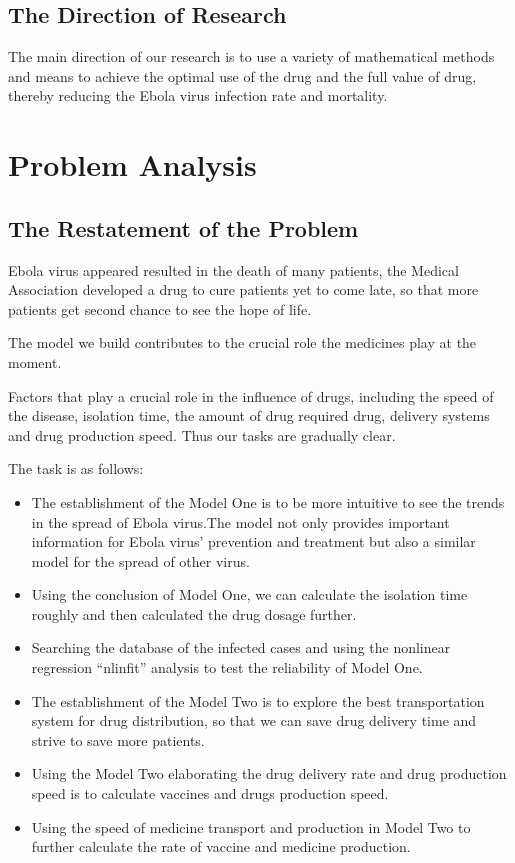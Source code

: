 \documentclass{icmmcm}
\begin{document}
\subsection{The Direction of Research}
The main direction of our research is to use a variety of
mathematical methods and means to achieve the optimal use 
of the drug and the full value of drug, thereby reducing the
Ebola virus infection rate and mortality.
\section{Problem Analysis}
\subsection{The Restatement of the Problem}
Ebola virus appeared resulted in the death of many patients,
the Medical Association developed a drug to cure patients yet
to come late, so that more patients get second chance to see
the hope of life.
\par The model we build contributes to the crucial role the 
medicines play at the moment.
\par Factors that play a crucial role in the influence of drugs,
including the speed of the disease, isolation time, the amount
of drug required drug, delivery systems and drug production
speed. Thus our tasks are gradually clear.
\par The task is as follows:
\begin{itemize}
  \item The establishment of the Model One is to be more
  intuitive to see the trends in the spread of Ebola virus.The
  model not only provides important information for Ebola
  virus' prevention and treatment but also a similar model for
  the spread of other virus.
  \item Using the conclusion of Model One, we can calculate the
  isolation time roughly and then calculated the drug dosage
  further.
  \item Searching the database of the infected cases and using
  the nonlinear regression ``nlinfit'' analysis to test the
  reliability of Model One.
  \item The establishment of the Model Two is to explore the
  best transportation system for drug distribution, so that we
  can save drug delivery time and strive to save more patients.
  \item Using the Model Two elaborating the drug delivery rate
  and drug production speed is to calculate vaccines and drugs
  production speed.
  \item Using the speed of medicine transport and 
  production in Model Two to further calculate the rate of
  vaccine and medicine production.
\end{itemize}
\end{document}
